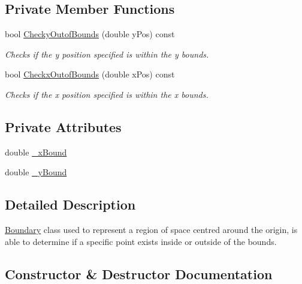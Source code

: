 \subsection*{Private Member Functions}
\begin{DoxyCompactItemize}
\item 
bool \hyperlink{class_boundary_a5063de08946b8303ddeff4c2b72e202e}{Checky\+Outof\+Bounds} (double y\+Pos) const
\begin{DoxyCompactList}\small\item\em Checks if the y position specified is within the y bounds. \end{DoxyCompactList}\item 
bool \hyperlink{class_boundary_a10d2d43b80364ce04cb22b90c9b54493}{Checkx\+Outof\+Bounds} (double x\+Pos) const
\begin{DoxyCompactList}\small\item\em Checks if the x position specified is within the x bounds. \end{DoxyCompactList}\end{DoxyCompactItemize}
\subsection*{Private Attributes}
\begin{DoxyCompactItemize}
\item 
double \hyperlink{class_boundary_a55685a68cc9b709898bdbe632d2dfeec}{\+\_\+x\+Bound}
\item 
double \hyperlink{class_boundary_a709e9e1f24faec6d4a35b50e6faffb8e}{\+\_\+y\+Bound}
\end{DoxyCompactItemize}


\subsection{Detailed Description}
\hyperlink{class_boundary}{Boundary} class used to represent a region of space centred around the origin, is able to determine if a specific point exists inside or outside of the bounds. 

\subsection{Constructor \& Destructor Documentation}
\mbox{\label{class_boundary_a7c4c8db45b13dab630e4c6ed7a958e71}} 
